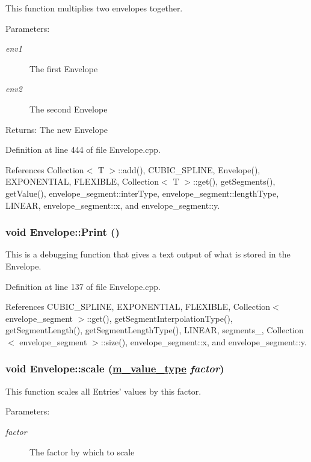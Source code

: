 This function multiplies two envelopes together. \begin{Desc}
\item[Parameters:]
\begin{description}
\item[{\em env1}]The first Envelope \item[{\em env2}]The second Envelope \end{description}
\end{Desc}
\begin{Desc}
\item[Returns:]The new Envelope \end{Desc}


Definition at line 444 of file Envelope.cpp.

References Collection$<$ T $>$::add(), CUBIC\_\-SPLINE, Envelope(), EXPONENTIAL, FLEXIBLE, Collection$<$ T $>$::get(), get\-Segments(), get\-Value(), envelope\_\-segment::inter\-Type, envelope\_\-segment::length\-Type, LINEAR, envelope\_\-segment::x, and envelope\_\-segment::y.\hypertarget{classEnvelope_a7}{
\subsubsection[Print]{\setlength{\rightskip}{0pt plus 5cm}void Envelope::Print ()}}
\label{classEnvelope_a7}


This is a debugging function that gives a text output of what is stored in the Envelope. 

Definition at line 137 of file Envelope.cpp.

References CUBIC\_\-SPLINE, EXPONENTIAL, FLEXIBLE, Collection$<$ envelope\_\-segment $>$::get(), get\-Segment\-Interpolation\-Type(), get\-Segment\-Length(), get\-Segment\-Length\-Type(), LINEAR, segments\_\-, Collection$<$ envelope\_\-segment $>$::size(), envelope\_\-segment::x, and envelope\_\-segment::y.\hypertarget{classEnvelope_a27}{
\subsubsection[scale]{\setlength{\rightskip}{0pt plus 5cm}void Envelope::scale (\hyperlink{Types_8h_a3}{m\_\-value\_\-type} {\em factor})}}
\label{classEnvelope_a27}


This function scales all Entries' values by this factor. \begin{Desc}
\item[Parameters:]
\begin{description}
\item[{\em factor}]The factor by which to scale \end{description}
\end{Desc}


